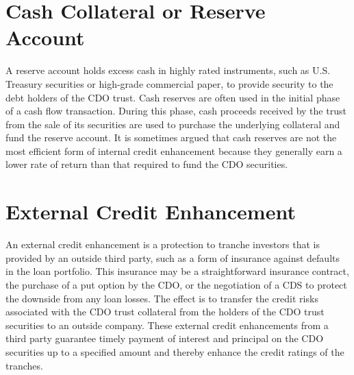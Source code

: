 \documentclass[11pt]{article}
\begin{document}
\section*{Cash Collateral or Reserve Account}
A reserve account holds excess cash in highly rated instruments, such as U.S. Treasury securities or high-grade commercial paper, to provide security to the debt holders of the CDO trust. Cash reserves are often used in the initial phase of a cash flow transaction. During this phase, cash proceeds received by the trust from the sale of its securities are used to purchase the underlying collateral and fund the reserve account. It is sometimes argued that cash reserves are not the most efficient form of internal credit enhancement because they generally earn a lower rate of return than that required to fund the CDO securities.

\section*{External Credit Enhancement}
An external credit enhancement is a protection to tranche investors that is provided by an outside third party, such as a form of insurance against defaults in the loan portfolio. This insurance may be a straightforward insurance contract, the purchase of a put option by the CDO, or the negotiation of a CDS to protect the downside from any loan losses. The effect is to transfer the credit risks associated with the CDO trust collateral from the holders of the CDO trust securities to an outside company. These external credit enhancements from a third party guarantee timely payment of interest and principal on the CDO securities up to a specified amount and thereby enhance the credit ratings of the tranches.
\end{document}
